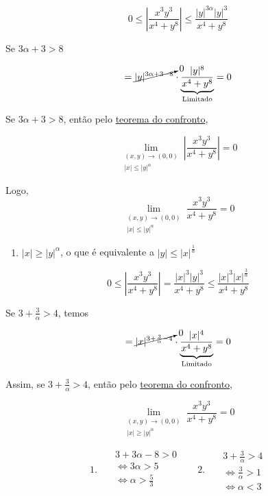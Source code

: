 \documentclass[
  letterpaper,
  DIV=11,
  numbers=noendperiod]{scrreprt}
\providecommand{\tightlist}{%
  \setlength{\itemsep}{0pt}\setlength{\parskip}{0pt}}\usepackage{longtable,booktabs,array}
\begin{document}
\[
0 \leq \left\lvert \frac{x^3y^3}{x^4+y^8}\right\rvert
\leq \frac{\lvert y \rvert^{3\alpha}\lvert y \rvert^{3}}{x^4+y^8}
\]

Se \(3 \alpha + 3 > 8\)

\[
= \cancelto{0}{\lvert y \rvert ^{3\alpha + 3 - 8}} \cdot
\underbrace{\frac{\lvert y \rvert^8}{x^4+y^8}}_{\text{Limitado}} = 0
\]

Se \(3 \alpha + 3 > 8\), então pelo
\href{limites.qmd$sec-confronto}{teorema do confronto},

\[
\lim_{\begin{aligned}(x,y)\rightarrow (0,0)
\\ \lvert x \rvert \leq \lvert y \rvert^{\alpha}
\end{aligned}} \left\lvert \frac{x^3y^3}{x^4+y^8} \right\rvert = 0
\]

Logo, \[
\lim_{\begin{aligned}(x,y)\rightarrow (0,0)
\\ \lvert x \rvert \leq \lvert y \rvert^{\alpha}
\end{aligned}} \frac{x^3y^3}{x^4+y^8} = 0
\]

\begin{enumerate}
\def\labelenumi{\arabic{enumi}.}
\setcounter{enumi}{1}
\tightlist
\item
  \(\lvert x \rvert \geq \lvert y \rvert^{\alpha}\), o que é equivalente
  a \(\lvert y \rvert \leq \lvert x \rvert^{\frac{1}{\alpha}}\)
\end{enumerate}

\[
0 \leq \left\lvert \frac{x^3y^3}{x^4+y^8}\right\rvert = 
\frac{\lvert x \rvert^3 \lvert y \rvert^3}{x^4+y^8}
\leq \frac{\lvert x \rvert^3 \lvert x \rvert^{\frac{3}{\alpha}}}{x^4+y^8}
\]

Se \(3 + \frac{3}{\alpha} > 4\), temos

\[
= \cancelto{0}{\lvert x \rvert^{3+ \frac{3}{\alpha}-4}} \cdot
\underbrace{\frac{\lvert x \rvert^4}{x^4+y^8}}_{\text{Limitado}} = 0
\]

Assim, se \(3 + \frac{3}{\alpha} > 4\), então pelo
\href{limites.qmd$sec-confronto}{teorema do confronto},

\[
\lim_{\begin{aligned}(x,y)\rightarrow (0,0)
\\ \lvert x \rvert \geq \lvert y \rvert^{\alpha}
\end{aligned}} \frac{x^3y^3}{x^4+y^8} = 0
\]

\[
1. ~~~
\begin{aligned}
  &3 + 3\alpha - 8 > 0 \\
  &\Leftrightarrow 3\alpha > 5 \\
  &\Leftrightarrow \alpha > \frac{5}{3} \\
\end{aligned} ~~~~~~~~
2. ~~~
\begin{aligned}
  &3 + \frac{3}{\alpha} > 4 \\
  &\Leftrightarrow \frac{3}{\alpha} > 1 \\
  &\Leftrightarrow \alpha < 3
\end{aligned}
\]
\end{document}
